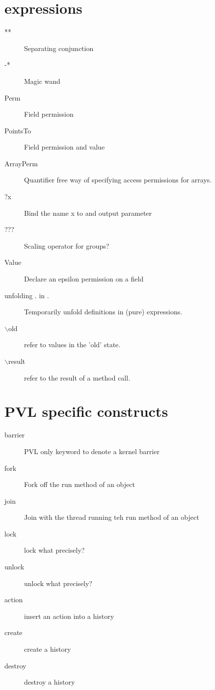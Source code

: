 \section*{expressions}

\begin{description}
\item[**] Separating conjunction
\item[-*] Magic wand
\item[Perm] Field permission
\item[PointsTo] Field permission and value
\item[ArrayPerm] Quantifier free way of specifying access permissions for arrays.
\item[?x] Bind the name x to and output parameter
\item[???] Scaling operator for groups?
\item[Value] Declare an epsilon permission on a field
\item[unfolding . in .] Temporarily unfold definitions in (pure) expressions.
\item[$\backslash$old] refer to values in the 'old' state.
\item[$\backslash$result] refer to the result of a method call.
\end{description}

\section*{PVL specific constructs}

\begin{description}
\item[barrier] PVL only keyword to denote a kernel barrier
\item[fork] Fork off the run method of an object
\item[join] Join with the thread running teh run method of an object
\item[lock] lock what precisely?
\item[unlock] unlock what precisely?
\item[action] insert an action into a history
\item[create] create a history
\item[destroy] destroy a history
\end{description}

